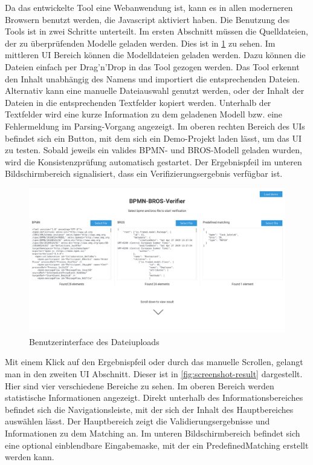 Da das entwickelte Tool eine Webanwendung ist, kann es in allen moderneren Browsern benutzt werden, die Javascript aktiviert haben.
Die Benutzung des Tools ist in zwei Schritte unterteilt.
Im ersten Abschnitt müssen die Quelldateien, der zu überprüfenden Modelle geladen werden.
Dies ist in \cref{fig:screenshot-upload} zu sehen.
Im mittleren UI Bereich können die Modelldateien geladen werden.
Dazu können die Dateien einfach per Drag'n'Drop in das Tool gezogen werden.
Das Tool erkennt den Inhalt unabhängig des Namens und importiert die entsprechenden Dateien.
Alternativ kann eine manuelle Dateiauswahl genutzt werden, oder der Inhalt der Dateien in die entsprechenden Textfelder kopiert werden.
Unterhalb der Textfelder wird eine kurze Information zu dem geladenen Modell bzw. eine Fehlermeldung im Parsing-Vorgang angezeigt.
Im oberen rechten Bereich des UIs befindet sich ein Button, mit dem sich ein Demo-Projekt laden lässt, um das UI zu testen.
Sobald jeweils ein valides BPMN- und BROS-Modell geladen wurden, wird die Konsistenzprüfung automatisch gestartet.
Der Ergebnispfeil im unteren Bildschirmbereich signalisiert, dass ein Verifizierungsergebnis verfügbar ist.


\begin{figure}
    \centering
    \includegraphics[width=\textwidth,keepaspectratio]{../images/Screenshot-Upload.png}%
    \caption{Benutzerinterface des Dateiuploads}%
    \label{fig:screenshot-upload}
\end{figure}

Mit einem Klick auf den Ergebnispfeil oder durch das manuelle Scrollen, gelangt man in den zweiten UI Abschnitt.
Dieser ist in \cref{fig:screenshot-result} dargestellt.
Hier sind vier verschiedene Bereiche zu sehen.
Im oberen Bereich werden statistische Informationen angezeigt.
Direkt unterhalb des Informationsbereiches befindet sich die Navigationsleiste, mit der sich der Inhalt des Hauptbereiches auswählen lässt.
Der Hauptbereich zeigt die Validierungsergebnisse und Informationen zu dem Matching an.
Im unteren Bildschirmbereich befindet sich eine optional einblendbare Eingabemaske, mit der ein PredefinedMatching erstellt werden kann.

